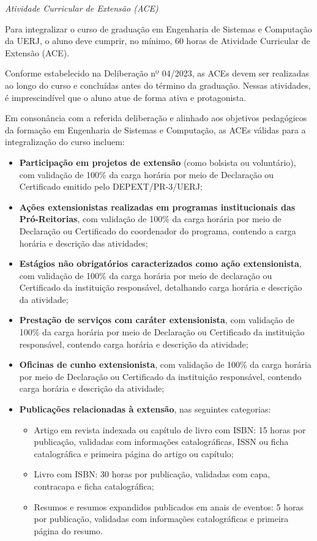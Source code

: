\textit{Atividade Curricular de Extensão (ACE)}

Para integralizar o curso de graduação em Engenharia de Sistemas e Computação da UERJ, o aluno deve cumprir, no mínimo, 60 horas de Atividade Curricular de Extensão (ACE).

Conforme estabelecido na Deliberação nº 04/2023, as ACEs devem ser realizadas ao longo do curso e concluídas antes do término da graduação. Nessas atividades, é imprescindível que o aluno atue de forma ativa e protagonista.

Em consonância com a referida deliberação e alinhado aos objetivos pedagógicos da formação em Engenharia de Sistemas e Computação, as ACEs válidas para a integralização do curso incluem:


\begin{itemize}
    \item \textbf{Participação em projetos de extensão} (como bolsista ou voluntário), com validação de 100\% da carga horária por meio de Declaração ou Certificado emitido pelo DEPEXT/PR-3/UERJ;
    \item \textbf{Ações extensionistas realizadas em programas institucionais das Pró-Reitorias}, com validação de 100\% da carga horária por meio de Declaração ou Certificado do coordenador do programa, contendo a carga horária e descrição das atividades;
    \item \textbf{Estágios não obrigatórios caracterizados como ação extensionista}, com validação de 100\% da carga horária por meio de declaração ou Certificado da instituição responsável, detalhando carga horária e descrição da atividade;
    \item \textbf{Prestação de serviços com caráter extensionista}, com validação de 100\% da carga horária por meio de Declaração ou Certificado da instituição responsável, contendo carga horária e descrição da atividade;
    \item \textbf{Oficinas de cunho extensionista}, com validação de 100\% da carga horária por meio de Declaração ou Certificado da instituição responsável, contendo carga horária e descrição da atividade;
    \item \textbf{Publicações relacionadas à extensão}, nas seguintes categorias:
	\begin{itemize}
		\item Artigo em revista indexada ou capítulo de livro com ISBN: 15 horas por publicação, validadas com informações catalográficas, ISSN ou ficha catalográfica e primeira página do artigo ou capítulo;
		\item Livro com ISBN: 30 horas por publicação, validadas com capa, contracapa e ficha catalográfica;
		\item Resumos e resumos expandidos publicados em anais de eventos: 5 horas por publicação, validadas com informações catalográficas e primeira página do resumo.
	\end{itemize}

\end{itemize}

